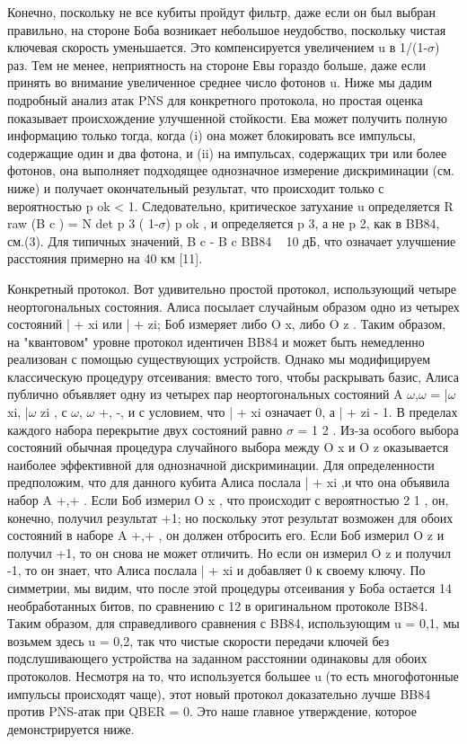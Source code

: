 Конечно, поскольку не все кубиты пройдут фильтр, даже если он был выбран правильно, на стороне Боба возникает небольшое неудобство, поскольку чистая ключевая скорость уменьшается. Это компенсируется увеличением u в 1/(1-$\sigma$) раз.
Тем не менее, неприятность на стороне Евы гораздо больше, даже если принять во внимание увеличенное среднее число фотонов u. Ниже мы дадим подробный анализ атак PNS для конкретного протокола, но простая оценка показывает происхождение улучшенной стойкости. Ева может получить полную информацию только тогда, когда (i) она может блокировать все импульсы, содержащие один и два фотона, и (ii) на импульсах, содержащих три или более фотонов, она выполняет подходящее однозначное измерение дискриминации (см. ниже) и получает окончательный результат, что происходит только с вероятностью p ok < 1. Следовательно, критическое затухание u определяется R raw (B c ) = N det p 3 ( 1-$\sigma$) p ok , и определяется p 3, а не p 2, как в BB84, см.(3). Для типичных значений, B c - B c BB84 ~ 10 дБ, что означает улучшение расстояния примерно на 40 км [11].

Конкретный протокол. Вот удивительно простой протокол, использующий четыре неортогональных состояния. Алиса посылает случайным образом одно из четырех состояний | + xi или | + zi; Боб измеряет либо O x, либо O z . Таким образом, на "квантовом" уровне протокол идентичен BB84 и может быть немедленно реализован с помощью существующих устройств. Однако мы модифицируем классическую процедуру отсеивания: вместо того, чтобы раскрывать базис, Алиса публично объявляет одну из четырех пар неортогональных состояний A $\omega$,$\omega$ = |$\omega$xi, |$\omega$ zi , с $\omega$, $\omega$ {+, -}, и с условием, что | + xi означает 0, а | + zi - 1. В пределах каждого набора перекрытие двух состояний равно $\sigma$ = 1 2 . Из-за особого выбора состояний обычная процедура случайного выбора между O x и O z оказывается наиболее эффективной для однозначной дискриминации. Для определенности предположим, что для данного кубита Алиса послала | + xi ,и что она объявила набор A +,+ . Если Боб измерил O x , что происходит с вероятностью 2 1 , он, конечно, получил результат +1; но поскольку этот результат возможен для обоих состояний в наборе A +,+ , он должен отбросить его.
Если Боб измерил O z и получил +1, то он снова не может отличить. Но если он измерил O z и получил -1, то он знает, что Алиса послала | + xi и добавляет 0 к своему ключу.
По симметрии, мы видим, что после этой процедуры отсеивания у Боба остается 14 необработанных битов, по сравнению с 12 в оригинальном протоколе BB84. Таким образом, для справедливого сравнения с BB84, использующим u = 0,1, мы возьмем здесь u = 0,2, так что чистые скорости передачи ключей без подслушивающего устройства на заданном расстоянии одинаковы для обоих протоколов. Несмотря на то, что используется большее u (то есть многофотонные импульсы происходят чаще), этот новый протокол доказательно лучше BB84 против PNS-атак при QBER = 0. Это наше главное утверждение, которое демонстрируется ниже.

